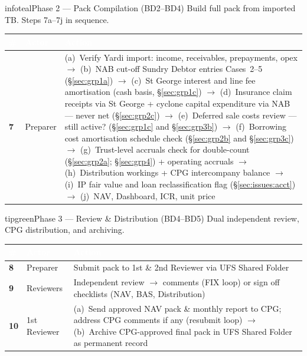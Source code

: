 \documentclass[10pt,a4paper]{article}
\begin{document}
\begin{phasebox}{infoteal}{Phase 2 --- Pack Compilation \normalfont\small(BD2--BD4)}
Build full pack from imported TB. Steps 7a--7j in sequence.
\end{phasebox}

{\small\sffamily
\begin{tabularx}{\textwidth}{@{}C{0.5cm} L{1.4cm} X@{}}
\textcolor{white}{\bfseries\#} & \textcolor{white}{\bfseries Actor} & \textcolor{white}{\bfseries Action} \\
\midrule
\textbf{7} & Preparer & (a)~Verify Yardi import: income, receivables, prepayments, opex $\to$ (b)~NAB cut-off Sundry Debtor entries Cases~2--5 (\S\ref{sec:grp1a}) $\to$ (c)~St George interest and line fee amortisation (cash basis, \S\ref{sec:grp1c}) $\to$ (d)~Insurance claim receipts via St George + cyclone capital expenditure via NAB --- never net (\S\ref{sec:grp2c}) $\to$ (e)~Deferred sale costs review --- still active? (\S\ref{sec:grp1c} and \S\ref{sec:grp3b}) $\to$ (f)~Borrowing cost amortisation schedule check (\S\ref{sec:grp2b} and \S\ref{sec:grp3c}) $\to$ (g)~Trust-level accruals check for double-count (\S\ref{sec:grp2a}; \S\ref{sec:grp4}) + operating accruals $\to$ (h)~Distribution workings + CPG intercompany balance $\to$ (i)~IP fair value and loan reclassification flag (\S\ref{sec:issues:acct}) $\to$ (j)~NAV, Dashboard, ICR, unit price \\
\bottomrule
\end{tabularx}}

\begin{phasebox}{tipgreen}{Phase 3 --- Review \& Distribution \normalfont\small(BD4--BD5)}
Dual independent review, CPG distribution, and archiving.
\end{phasebox}

{\small\sffamily
\begin{tabularx}{\textwidth}{@{}C{0.5cm} L{1.4cm} X@{}}
\textcolor{white}{\bfseries\#} & \textcolor{white}{\bfseries Actor} & \textcolor{white}{\bfseries Action} \\
\midrule
\textbf{8} & Preparer & Submit pack to 1st \& 2nd Reviewer via UFS Shared Folder \\
\textbf{9} & Reviewers & Independent review $\to$ comments (FIX loop) or sign off checklists (NAV, BAS, Distribution) \\
\textbf{10} & 1st Reviewer & (a)~Send approved NAV pack \& monthly report to CPG; address CPG comments if any (resubmit loop) $\to$ (b)~Archive CPG-approved final pack in UFS Shared Folder as permanent record \\
\bottomrule
\end{tabularx}}
\end{document}
